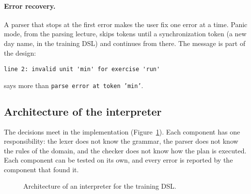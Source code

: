 \paragraph{Error recovery.} A parser that stops at the first error makes the
user fix one error at a time. Panic mode, from the parsing lecture, skips
tokens until a synchronization token (a new day name, in the training DSL)
and continues from there. The message is part of the design:
\begin{lstlisting}
line 2: invalid unit 'min' for exercise 'run'
\end{lstlisting}
says more than \texttt{parse error at token 'min'}.

\subsection{Architecture of the interpreter}

The decisions meet in the implementation (Figure~\ref{fig:architecture}). Each
component has one responsibility: the lexer does not know the grammar, the
parser does not know the rules of the domain, and the checker does not know
how the plan is executed. Each component can be tested on its own, and every
error is reported by the component that found it.

\begin{figure}[h]
\centering
{}
\caption{Architecture of an interpreter for the training DSL.}
\label{fig:architecture}
\end{figure}

